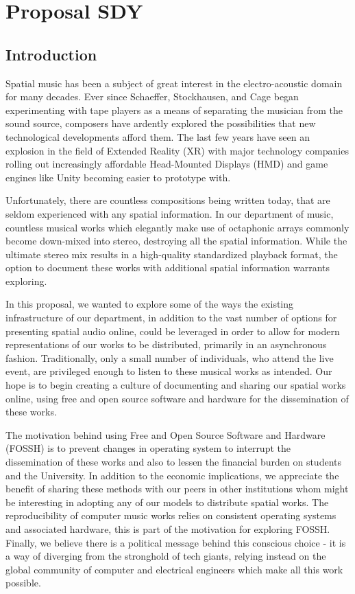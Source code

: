 \chapter{Proposal SDY} \label{ch:prop-sdy}

\section{Introduction}

Spatial music has been a subject of great interest in the electro-acoustic domain for many decades. Ever since Schaeffer, Stockhausen, and Cage began experimenting with tape players as a means of separating the musician from the sound source, composers have ardently explored the possibilities that new technological developments afford them. The last few years have seen an explosion in the field of Extended Reality (XR) with major technology companies rolling out increasingly affordable Head-Mounted Displays (HMD) and game engines like Unity becoming easier to prototype with. 

Unfortunately, there are countless compositions being written today, that are seldom experienced with any spatial information. In our department of music, countless musical works which elegantly make use of octaphonic arrays commonly become down-mixed into stereo, destroying all the spatial information. While the ultimate stereo mix results in a high-quality standardized playback format, the option to document these works with additional spatial information warrants exploring. 

In this proposal, we wanted to explore some of the ways the existing infrastructure of our department, in addition to the vast number of options for presenting spatial audio online, could be leveraged in order to allow for modern representations of our works to be distributed, primarily in an asynchronous fashion. Traditionally, only a small number of individuals, who attend the live event, are privileged enough to listen to these musical works as intended. Our hope is to begin creating a culture of documenting and sharing our spatial works online, using free and open source software and hardware for the dissemination of these works. 

The motivation behind using Free and Open Source Software and Hardware (FOSSH) is to prevent changes in operating system to interrupt the dissemination of these works and also to lessen the financial burden on students and the University. In addition to the economic implications, we appreciate the benefit of sharing these methods with our peers in other institutions whom might be interesting in adopting any of our models to distribute spatial works. The reproducibility of computer music works relies on consistent operating systems and associated hardware, this is part of the motivation for exploring FOSSH. Finally, we believe there is a political message behind this conscious choice - it is a way of diverging from the stronghold of tech giants, relying instead on the global community of computer and electrical engineers which make all this work possible. 

